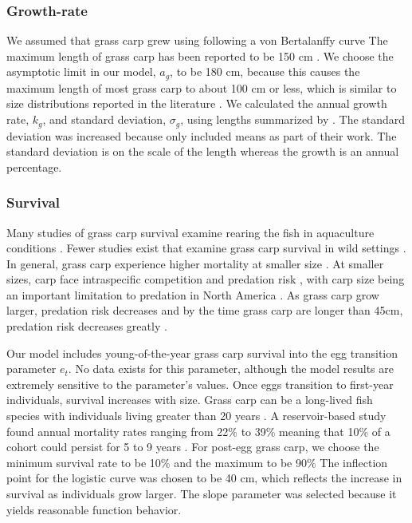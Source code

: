 \documentclass{article}[12pt]
\begin{document}
\subsubsection{Growth-rate}

We assumed that grass carp grew using following a von Bertalanffy curve \citep{bolker2008ecological}
The maximum length of grass carp has been reported to be 150 cm \citep{USFWS2014grass}.
We choose the asymptotic limit in our model, \(a_g\), to be 180 cm, because this causes the maximum length of most grass carp to about 100 cm or less, which is similar to size distributions reported in the literature \citep{shireman1983synopsis,  martyn1986mapping}.
We calculated the annual growth rate, \(k_g\), and standard deviation, \(\sigma_g\), using lengths summarized by \citet{shireman1983synopsis}.
The standard deviation was increased because \citet{shireman1983synopsis} only included means as part of their work.
The standard deviation is on the scale of the length whereas the growth is an annual percentage. 


\subsubsection{Survival}

Many studies of grass carp survival examine rearing the fish in aquaculture conditions \citep[e.g.,][]{stott1973note, kilambi1980food, shelton1981density, cassani1986efficient}.
Fewer studies exist that examine grass carp survival in wild settings \citep{shireman1983synopsis}.
In general, grass carp experience higher mortality at smaller size \citep{shireman1983synopsis}.
At smaller sizes, carp face intraspecific competition and predation risk \citep{shireman1983synopsis}, with carp size being an important limitation to predation in North America \citep{shireman1978size}.
As grass carp grow larger, predation risk decreases and by the time grass carp are longer than 45cm, predation risk decreases greatly \citep{shireman1978size}.

Our model includes  young-of-the-year grass carp survival into the egg transition parameter \(e_t\).
No data exists for this parameter, although the model results are extremely sensitive to the parameter's values. 
Once eggs transition to first-year individuals, survival increases with size.
Grass carp can be a long-lived fish species with individuals living greater than 20 years \citep{shireman1983synopsis}.
A reservoir-based study found annual mortality rates ranging from 22\% to 39\% meaning that 10\% of a cohort could persist for 5 to 9 years \citep{kirk2003longevity}.
For post-egg grass carp, we choose the minimum survival rate to be 10\% and the maximum to be 90\%
The inflection point for the logistic curve was chosen to be 40 cm, which reflects the increase in survival as individuals grow larger. 
The slope parameter was selected because it yields reasonable function behavior.
\end{document}
